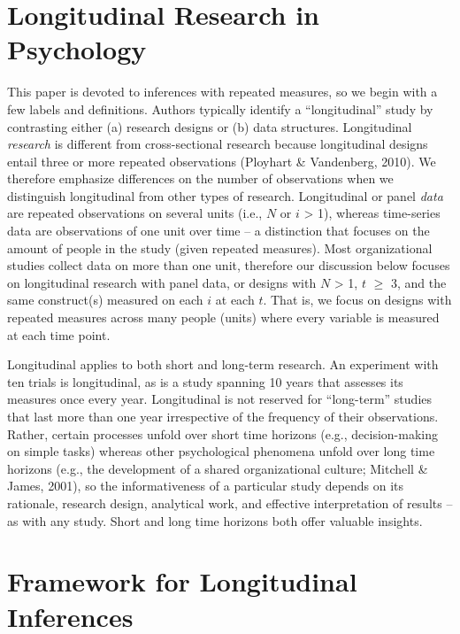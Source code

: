 \documentclass[english,,man]{apa6}
\theoremstyle{definition}
\theoremstyle{definition}
\theoremstyle{definition}
\theoremstyle{remark}
\begin{document}
\hypertarget{longitudinal-research-in-psychology}{%
\section{Longitudinal Research in
Psychology}\label{longitudinal-research-in-psychology}}

This paper is devoted to inferences with repeated measures, so we begin
with a few labels and definitions. Authors typically identify a
\enquote{longitudinal} study by contrasting either (a) research designs
or (b) data structures. Longitudinal \emph{research} is different from
cross-sectional research because longitudinal designs entail three or
more repeated observations (Ployhart \& Vandenberg, 2010). We therefore
emphasize differences on the number of observations when we distinguish
longitudinal from other types of research. Longitudinal or panel
\emph{data} are repeated observations on several units (i.e., \(N\) or
\(i\) \textgreater{} 1), whereas time-series data are observations of
one unit over time -- a distinction that focuses on the amount of people
in the study (given repeated measures). Most organizational studies
collect data on more than one unit, therefore our discussion below
focuses on longitudinal research with panel data, or designs with \(N\)
\textgreater{} 1, \(t\) \(\geq\) 3, and the same construct(s) measured
on each \(i\) at each \(t\). That is, we focus on designs with repeated
measures across many people (units) where every variable is measured at
each time point.

Longitudinal applies to both short and long-term research. An experiment
with ten trials is longitudinal, as is a study spanning 10 years that
assesses its measures once every year. Longitudinal is not reserved for
\enquote{long-term} studies that last more than one year irrespective of
the frequency of their observations. Rather, certain processes unfold
over short time horizons (e.g., decision-making on simple tasks) whereas
other psychological phenomena unfold over long time horizons (e.g., the
development of a shared organizational culture; Mitchell \& James,
2001), so the informativeness of a particular study depends on its
rationale, research design, analytical work, and effective
interpretation of results -- as with any study. Short and long time
horizons both offer valuable insights.

\hypertarget{framework-for-longitudinal-inferences}{%
\section{Framework for Longitudinal
Inferences}\label{framework-for-longitudinal-inferences}}
\end{document}
